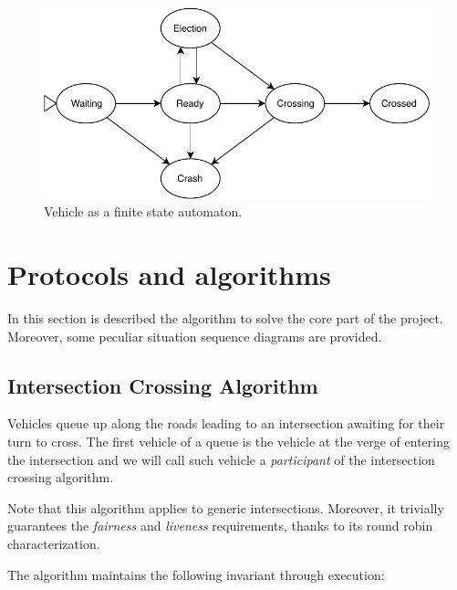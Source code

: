 \documentclass{memoir}
\begin{document}
\begin{figure}
	\centering
	\includegraphics[width=0.8\linewidth]{vehicle_automaton.pdf}
	\caption{Vehicle as a finite state automaton.}
	\label{fig:vehicle-automaton}
\end{figure}

\section{Protocols and algorithms}
In this section is described the algorithm to solve the core part of the project. Moreover, some peculiar situation sequence diagrams are provided.

\subsection{Intersection Crossing Algorithm}
Vehicles queue up along the roads leading to an intersection awaiting for their turn to cross. The first vehicle of a queue is the vehicle at the verge of entering the intersection and we will call such vehicle a \emph{participant} of the intersection crossing algorithm.

Note that this algorithm applies to generic intersections. Moreover, it trivially guarantees the \emph{fairness} and \emph{liveness} requirements, thanks to its round robin characterization.

The algorithm maintains the following invariant through execution:
\end{document}
